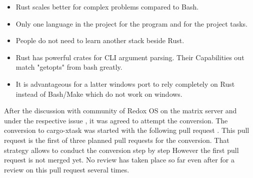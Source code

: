 \begin{itemize}
	\item Rust scales better for complex problems compared to Bash.
	\item Only one language in the project for the program and for the project tasks.
	\item People do not need to learn another stack beside Rust.
	\item Rust has powerful crates for CLI argument parsing. Their Capabilities out match "getopts" from bash greatly.
	\item It is advantageous for a latter windows port to rely completely on Rust instead of Bash/Make which do not work on windows.
\end{itemize}

After the discussion with community of Redox OS on the matrix server and under the respective issue
\cite{issue_convert_make_files_to_xtask}, it was agreed to attempt the conversion.
The conversion to cargo-xtask was started with the following pull request \cite{pr_still_opened_cargo_xtask}.
This pull request is the first of three planned pull requests for the conversion.
That strategy allows to conduct the conversion step by step
However the first pull request is not merged yet.
No review has taken place so far even after for a review on this pull request several times.



